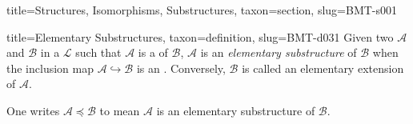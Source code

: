 \documentclass[a4paper]{article}
\begin{document}
\begin{tree}{title={Structures, Isomorphisms, Substructures}, taxon={section}, slug={BMT-s001}}
\begin{tree}{title={Elementary Substructures}, taxon={definition}, slug={BMT-d031}}
    Given two  \(\mathcal {A}\) and \(\mathcal {B}\) in a  \(\mathcal {L}\)
    such that \(\mathcal  A\) is a  of \(\mathcal  B\),
    \(\mathcal  A\) is an \emph{elementary substructure} of \(\mathcal  B\) when the inclusion map \(\mathcal  A \hookrightarrow \mathcal  B\)
    is an .
    Conversely, \(\mathcal  B\) is called an elementary extension of \(\mathcal  A\).
\par{
    One writes \(\mathcal  A \preceq \mathcal  B\) to mean \(\mathcal  A\) is an elementary substructure of \(\mathcal  B\).
}
\end{tree}

\end{tree}


  
  
\end{document}
